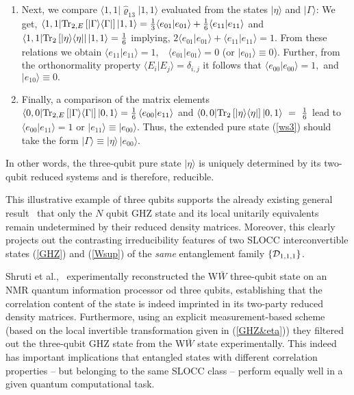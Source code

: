 \documentclass[pra,preprint,a4paper,superscriptaddress]{revtex4}
\begin{document}
{\begin{enumerate}
\item Next, we compare  $\langle 1,1\vert \hat{\varrho}_{13}\vert 1,1\rangle$ evaluated from the states 
$\vert\eta\rangle$ and $\vert\Gamma\rangle$:  
We get, 
$\langle 1,1|{\rm Tr}_{2, E}\, [|\Gamma\rangle \langle\Gamma|]\,\vert 1,1\rangle=
\frac{1}{3}\langle e_{01}|e_{01}\rangle+\frac{1}{6}\langle e_{11}|e_{11}\rangle$ 
and $\langle 1,1|{\rm Tr}_{2}\, [|\eta\rangle \langle\eta|\vert\, |1,1\rangle=\frac{1}{6}$ 
implying,  
$2\langle e_{01}|e_{01}\rangle+\langle e_{11}|e_{11}\rangle=1.$ 
From these relations we obtain $\langle e_{11}|e_{11}\rangle=1,$ \ 
$\langle e_{01}|e_{01}\rangle=0$ (or $\vert e_{01}\rangle\equiv 0$).
Further, from the orthonormality property $\langle E_i\vert E_j\rangle=\delta_{i,j}$
it follows that $\langle e_{00}\vert e_{00}\rangle=1,$ and  
$\vert e_{10}\rangle\equiv 0.$ 

\item Finally, a comparison of the matrix elements    
$\langle 0,0|{\rm Tr}_{2,E}\,[\vert\Gamma\rangle \langle\Gamma\vert]\, |0,1\rangle= 
\frac{1}{6}\, \langle e_{00}|e_{11}\rangle$ and 
 $\langle 0,0|{\rm Tr}_{2}\,[\vert\eta\rangle \langle\eta\vert]\, |0,1\rangle~=~ 
\frac{1}{6}$ 
lead to $\langle e_{00}|e_{11}\rangle=1$ or $\vert e_{11}\rangle\equiv \vert e_{00}\rangle.$ 
Thus,  the extended pure state (\ref{ws3}) should take the form 
$\vert \Gamma\rangle\equiv \vert \eta\rangle \, \vert e_{00}\rangle.$ 
\end{enumerate}
In other words,  the three-qubit pure state $\vert \eta\rangle$  is uniquely determined by its two-qubit reduced %
systems and is therefore, reducible. 

This illustrative example of three qubits supports the already existing general result~\cite{Walck,Walck2} that only the $N$ qubit GHZ state and its local unitarily equivalents remain undetermined by their reduced density matrices. Moreover, this clearly projects out the contrasting  irreducibility features of two SLOCC interconvertible states (\ref{GHZ}) and (\ref{Wsup}) of the {\em same}  
entanglement family $\{{\cal D}_{1,1,1}\}$.   

Shruti et al.,~\cite{arvind} experimentally reconstructed the W$\bar W$ three-qubit state on an NMR quantum
information processor od three qubits,  establishing that the correlation content of the state is indeed imprinted in 
 its two-party reduced density matrices. Furthermore, using an explicit measurement-based scheme (based on the local invertible transformation given in (\ref{GHZ&eta}))  they filtered out the  three-qubit GHZ state from the W$\bar W$ state experimentally. This indeed has important implications that  entangled states with different correlation properties -- but  belonging to the same SLOCC class -- perform equally well in a given quantum computational task.  
 


}
\end{document}
